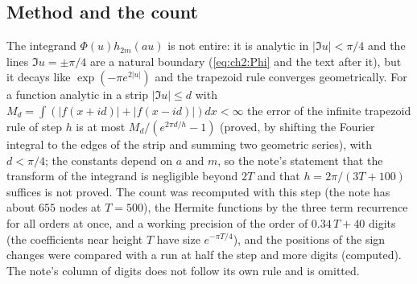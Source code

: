 \subsection{Method and the count}

The integrand $\Phi(u)h_{2m}(au)$ is not entire: it is analytic in $|\Im u|<\pi/4$ and the lines $\Im u=\pm\pi/4$ are a natural boundary (\eqref{eq:ch2:Phi} and the text after it), but it decays like $\exp(-\pi e^{2|u|})$ and the trapezoid rule converges geometrically. For a function analytic in a strip $|\Im u|\le d$ with $M_d=\int(|f(x+id)|+|f(x-id)|)dx<\infty$ the error of the infinite trapezoid rule of step $h$ is at most $M_d/(e^{2\pi d/h}-1)$ (proved, by shifting the Fourier integral to the edges of the strip and summing two geometric series), with $d<\pi/4$; the constants depend on $a$ and $m$, so the note's statement that the transform of the integrand is negligible beyond $2T$ and that $h=2\pi/(3T+100)$ suffices is not proved. The count was recomputed with this step (the note has about $655$ nodes at $T=500$), the Hermite functions by the three term recurrence for all orders at once, and a working precision of the order of $0.34\,T+40$ digits (the coefficients near height $T$ have size $e^{-\pi T/4}$), and the positions of the sign changes were compared with a run at half the step and more digits (computed). The note's column of digits does not follow its own rule and is omitted.

\begin{table}[h]\centering\small
{}
\caption{Number of sign changes of $b_m(a)$ for $t_m(a)\le T$ against the zero count $N(T)$ (computed). The coefficient counts of the note ($627$, $1738$, $6947$, $7002$) were two too large.}\label{tr:tab:count}
\end{table}

